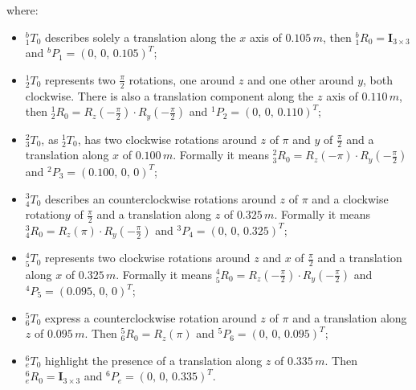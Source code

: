 where:
\begin{itemize}
	\item $^b_1 T_0$ describes solely a translation along the $x$ axis of $0.105\,m$, then $^b_1 R_0 = \mathbf I_{3 \times 3}$ and $^b P_1 = (0,\,0,\,0.105)^T$;
	\item $^1_2 T_0$ represents two $\frac{\pi}{2}$ rotations, one around $z$ and one other around $y$, both clockwise. There is also a translation component along the $z$ axis of $0.110\,m$, then $^1_2 R_0 = R_z(-\frac{\pi}{2}) \cdot R_y(-\frac{\pi}{2})$ and $^1 P_2 = (0,\,0,\,0.110)^T$;
	\item $^2_3 T_0$, as $^1_2 T_0$, has two clockwise rotations around $z$ of $\pi$ and $y$ of $\frac{\pi}{2}$ and a translation along $x$ of $0.100\,m$. Formally it means $^2_3 R_0 = R_z(-\pi) \cdot R_y(-\frac{\pi}{2})$ and $^2 P_3 = (0.100,\,0,\,0)^T$;
	\item $^3_4 T_0$ describes an counterclockwise rotations around $z$ of $\pi$ and a clockwise rotation$y$ of $\frac{\pi}{2}$ and a translation along $z$ of $0.325\,m$. Formally it means $^3_4 R_0 = R_z(\pi) \cdot R_y(-\frac{\pi}{2})$ and $^3 P_4 = (0,\,0,\,0.325)^T$;
	\item $^4_5 T_0$ represents two clockwise rotations around $z$ and $x$ of $\frac{\pi}{2}$ and a translation along $x$ of $0.325\,m$. Formally it means $^4_5 R_0 = R_z(-\frac{\pi}{2}) \cdot R_y(-\frac{\pi}{2})$ and $^4 P_5 = (0.095,\,0,\,0)^T$;
	\item $^5_6 T_0$ express a counterclockwise rotation around $z$ of $\pi$ and a translation along $z$ of $0.095\,m$. Then $^5_6 R_0 = R_z(\pi)$ and $^5 P_6 = (0,\,0,\,0.095)^T$;
	\item $^6_e T_0$ highlight the presence of a translation along $z$ of $0.335\,m$. Then $^6_e R_0 = \mathbf I_{3 \times 3}$ and $^6 P_e = (0,\,0,\,0.335)^T$.
\end{itemize}

